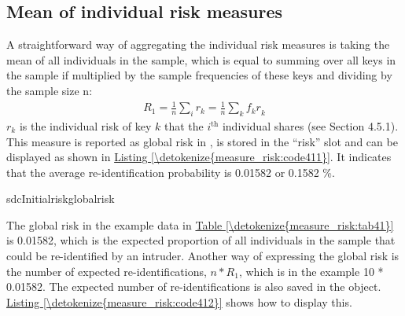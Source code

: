 \documentclass[letterpaper,10pt,english]{sphinxmanual}
\begin{document}
\subsection{Mean of individual risk measures}
\label{\detokenize{measure_risk:mean-of-individual-risk-measures}}
A straightforward way of aggregating the individual risk measures is
taking the mean of all individuals in the sample, which is equal to
summing over all keys in the sample if multiplied by the sample
frequencies of these keys and dividing by the sample size n:
\begin{equation*}
\begin{split}R_{1} = \frac{1}{n}\sum_{i}^{}r_{k} = \frac{1}{n}\sum_{k}^{}{f_{k}r}_{k}\end{split}
\end{equation*}
\(r_{k}\) is the individual risk of key \(k\) that the
\(i\)$^{\text{th}}$ individual shares (see Section 4.5.1). This measure
is reported as global risk in , is stored in the “risk” slot
and can be displayed as shown in \hyperref[\detokenize{measure_risk:code411}]{Listing \ref{\detokenize{measure_risk:code411}}}. It indicates that the
average re-identification probability is 0.01582 or 0.1582 \%.

\def\sphinxLiteralBlockLabel{\label{\detokenize{measure_risk:code411}}}
%
\begin{sphinxVerbatim}[commandchars=\\\{\},numbers=left,firstnumber=1,stepnumber=1]
 sdcInitialriskglobalrisk

 \PYG{p}{[}\PYG{p}{]} 
\end{sphinxVerbatim}

The global risk in the example data in \hyperref[\detokenize{measure_risk:tab41}]{Table \ref{\detokenize{measure_risk:tab41}}} is 0.01582, which is
the expected proportion of all individuals in the sample that could be
re-identified by an intruder. Another way of expressing the global risk
is the number of expected re-identifications, \(n*R_{1}\), which is
in the example 10 * 0.01582. The expected number of re-identifications
is also saved in the  object. \hyperref[\detokenize{measure_risk:code412}]{Listing \ref{\detokenize{measure_risk:code412}}} shows how to
display this.
\end{document}

